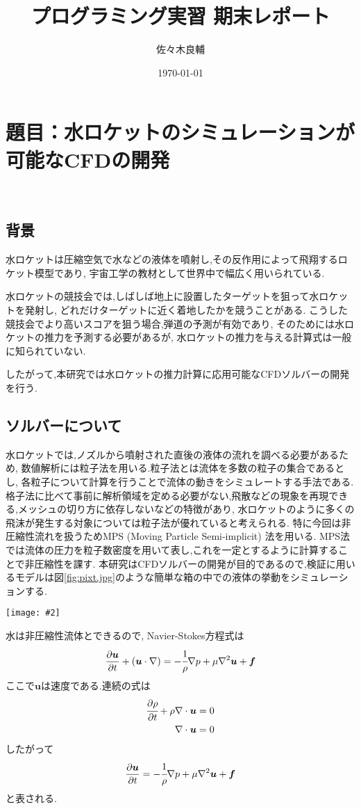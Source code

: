 \documentclass[uplatex,a4j,11pt]{jsarticle}
\makeatletter
\def\fgcaption{\def\@captype{figure}\caption}
\newcommand{\mfig}[3][width=15cm]{
\begin{center}
    \texttt{[image: \#2]}
\fgcaption{#3 \label{fig:#2}}
\end{center}
}
\makeatother
\begin{document}
\title{プログラミング実習 期末レポート}
\author{佐々木良輔}
\date{\today}
\maketitle

\section*{題目：水ロケットのシミュレーションが可能なCFDの開発}
\
\subsection{背景}
水ロケットは圧縮空気で水などの液体を噴射し,その反作用によって飛翔するロケット模型であり,
宇宙工学の教材として世界中で幅広く用いられている.

水ロケットの競技会では,しばしば地上に設置したターゲットを狙って水ロケットを発射し,
どれだけターゲットに近く着地したかを競うことがある.
こうした競技会でより高いスコアを狙う場合,弾道の予測が有効であり,
そのためには水ロケットの推力を予測する必要があるが,
水ロケットの推力を与える計算式は一般に知られていない.

したがって,本研究では水ロケットの推力計算に応用可能なCFDソルバーの開発を行う.
\subsection{ソルバーについて}
水ロケットでは,ノズルから噴射された直後の液体の流れを調べる必要があるため,
数値解析には粒子法を用いる.粒子法とは流体を多数の粒子の集合であるとし,
各粒子について計算を行うことで流体の動きをシミュレートする手法である.
格子法に比べて事前に解析領域を定める必要がない,飛散などの現象を再現できる,メッシュの切り方に依存しないなどの特徴があり,
水ロケットのように多くの飛沫が発生する対象については粒子法が優れていると考えられる.
特に今回は非圧縮性流れを扱うためMPS (Moving Particle Semi-implicit) 法を用いる.\cite{ryuusi}\cite{ELEM13}
MPS法では流体の圧力を粒子数密度を用いて表し,これを一定とするように計算することで非圧縮性を課す.
本研究はCFDソルバーの開発が目的であるので,検証に用いるモデルは図\ref{fig:pixt.jpg}のような簡単な箱の中での液体の挙動をシミュレーションする.
\mfig[width=10cm]{init.eps}{検証モデル(青点:流体粒子,灰点:ダミー粒子,黒点:壁粒子)\cite{ELEM13}}
水は非圧縮性流体とできるので, Navier-Stokes方程式は
\begin{align}
    \label{NSequ}
    \frac{\partial\bm{u}}{\partial t}+(\bm{u}\cdot\nabla)=-\cfrac{1}{\rho}\nabla p+\mu\nabla^2\bm{u}+\bm{f}
\end{align}
ここで$\bm{u}$は速度である.連続の式は
\begin{align}
    \label{cont1}
    \cfrac{\partial\rho}{\partial t}+\rho\nabla\cdot\bm{u}=0\\
    \label{cont2}
    \nabla\cdot\bm{u}=0
\end{align}
したがって
\begin{align}
    \label{NSequ2}
    \frac{\partial\bm{u}}{\partial t}=-\cfrac{1}{\rho}\nabla p+\mu\nabla^2\bm{u}+\bm{f}
\end{align}
と表される.
\end{document}
